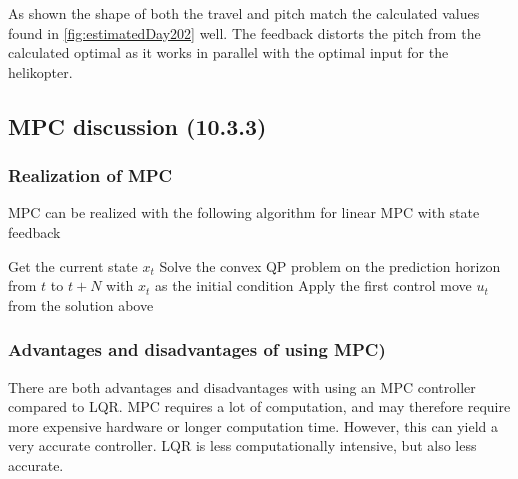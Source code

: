 As shown the shape of both the travel and pitch match the calculated values found in \ref{fig:estimatedDay202} well. The feedback distorts the pitch from the calculated optimal as it works in parallel with the optimal input for the helikopter.

\subsection{MPC discussion (10.3.3)}

\subsubsection{Realization of MPC}
MPC can be realized with the following algorithm for linear MPC with state feedback

\begin{algorithmic}
\State Get the current state $x_t$
\State Solve the convex QP problem on the prediction horizon from $t$ to $t+N$ with $x_t$ as the initial condition
\State Apply the first control move $u_t$ from the solution above
\EndFor
\end{algorithmic}

\subsubsection{Advantages and disadvantages of using MPC)}
There are both advantages and disadvantages with using an MPC controller compared to LQR.   
MPC requires a lot of computation, and may therefore require more expensive hardware or longer computation time. However, this can yield a very accurate controller. LQR is less computationally intensive, but also less accurate.

